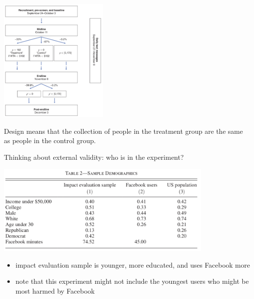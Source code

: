 \documentclass[aspectratio=169]{beamer}
\begin{document}
\begin{frame}

\begin{center}
\includegraphics[width=0.4\textwidth]{figures/allcott_welfare_2020_fig1}
\end{center}

Design means that the collection of people in the treatment group are the same as people in the control group.


\end{frame}
\begin{frame}

Thinking about external validity: who is in the experiment? \pause

\begin{center}
\includegraphics[width=0.8\textwidth]{figures/allcott_welfare_2020_tab2}
\end{center}

\begin{itemize}
\item impact evaluation sample is younger, more educated, and uses Facebook more
\item note that this experiment might not include the youngest users who might be most harmed by Facebook
\end{itemize}

\end{frame}
\end{document}
